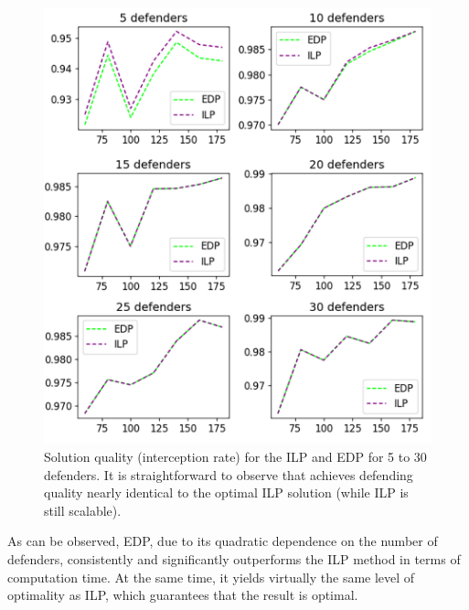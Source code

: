 \begin{figure}[h!]
    \centering
    \includegraphics[width=\linewidth]{chapters/pd/fig/def_quality-v.png}
    \caption{Solution quality (interception rate) for the ILP and EDP for 5 to 30 defenders. It is straightforward to observe that \ours achieves defending quality nearly identical to the optimal ILP solution (while ILP is still scalable).}
    \label{fig:def_quality}
\end{figure}

As can be observed, EDP, due to its quadratic dependence on the number of defenders, consistently and significantly outperforms the ILP method in terms of computation time. At the same time, it yields virtually the same level of optimality as ILP, which guarantees that the result is optimal. 

